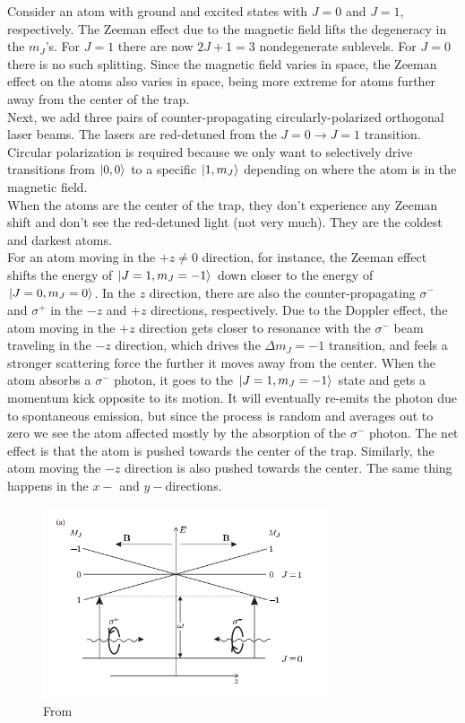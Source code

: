 \documentclass{book}
\theoremstyle{definition}
\begin{document}
Consider an atom with ground and excited states with $J=0$ and $J=1$, respectively. The Zeeman effect due to the magnetic field lifts the degeneracy in the $m_J$'s. For $J=1$ there are now $2J+1 = 3$ nondegenerate sublevels. For $J=0$ there is no such splitting. Since the magnetic field varies in space, the Zeeman effect on the atoms also varies in space, being more extreme for atoms further away from the center of the trap. \\


Next, we add three pairs of counter-propagating circularly-polarized orthogonal laser beams. The lasers are red-detuned from the $J=0 \to J=1$ transition. Circular polarization is required because we only want to selectively drive transitions from $\ket{0,0}$ to a specific $\ket{1,m_J}$ depending on where the atom is in the magnetic field. \\


When the atoms are the center of the trap, they don't experience any Zeeman shift and don't see the red-detuned light (not very much). They are the coldest and darkest atoms.\\


For an atom moving in the $+z \neq 0$ direction, for instance, the Zeeman effect shifts the energy of $\ket{J=1,m_J=-1}$ down closer to the energy of $\ket{J=0,m_J=0}$. In the $z$ direction, there are also the counter-propagating $\sigma^-$ and $\sigma^+$ in the $- z$ and $+z$ directions, respectively. Due to the Doppler effect, the atom moving in the $+z$ direction gets closer to resonance with the $\sigma^-$ beam traveling in the $-z$ direction, which drives the $\Delta m_J = -1$ transition, and feels a stronger scattering force the further it moves away from the center. When the atom absorbs a $\sigma^-$ photon, it goes to the $\ket{J=1,m_J=-1}$ state and gets a momentum kick opposite to its motion. It will eventually re-emits the photon due to spontaneous emission, but since the process is random and averages out to zero we see the atom affected mostly by the absorption of the $\sigma^-$ photon. The net effect is that the atom is pushed towards the center of the trap. Similarly, the atom moving the $-z$ direction is also pushed towards the center. The same thing happens in the $x-$ and $y-$directions.  
 	
 	
\begin{figure}[!htb]
	\centering
	\includegraphics[width=0.75\textwidth]{images/foot_1}
	\caption{From \cite{foot2005atomic}}
\end{figure}
\end{document}
